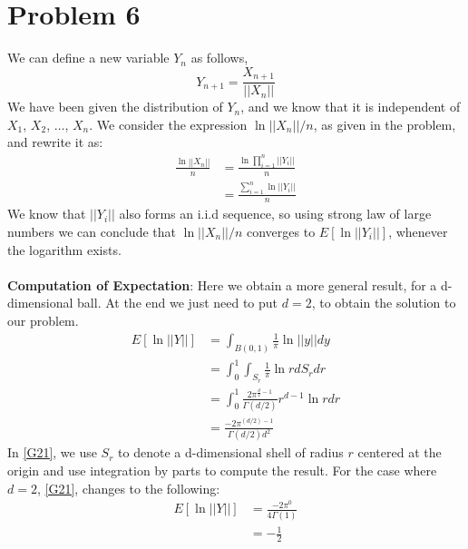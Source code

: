 \documentclass{article}
\begin{document}
\section{Problem 6}
We can define a new variable $Y_n$ as follows, 
\begin{equation}
    \label{G19}
    Y_{n+1} = \frac{X_{n+1}}{||X_n||}
\end{equation}
We have been given the distribution of $Y_n$, and we know that it is independent of $X_1$, $X_2$, $\dots$, $X_n$. We consider the expression $\ln{||X_n||}/n$, as given in the problem, and rewrite it as: 
\begin{equation}
    \label{G20}
    \begin{split}
        \frac{\ln{||X_n||}}{n} &= \frac{\ln{\prod_{i=1}^{n}||Y_i||}}{n}\\
        &= \frac{\sum_{i=1}^{n} \ln{||Y_i||}}{n}
    \end{split}
\end{equation}
We know that $||Y_i||$ also forms an i.i.d sequence, so using strong law of large numbers we can conclude that $\ln{||X_n||}/n$ converges to $E[\ln{||Y_i||}]$, whenever the logarithm exists.\\\\
\textbf{Computation of Expectation}: Here we obtain a more general result, for a d-dimensional ball. At the end we just need to put $d=2$, to obtain the solution to our problem. 
\begin{equation}
    \label{G21}
    \begin{split}
        E[\ln{||Y||}] &= \int_{B(0, 1)} \frac{1}{\pi} \ln{||y||} dy\\
        &= \int_{0}^{1} \int_{S_r}  \frac{1}{\pi} \ln{r} dS_r dr\\
        &= \int_{0}^{1} \frac{2\pi^{\frac{d}{2}-1}}{\Gamma(d/2)} r^{d-1} \ln{r} dr\\
        &= \frac{-2\pi^{(d/2)-1}}{\Gamma(d/2)d^2}
    \end{split}
\end{equation}
In \ref{G21}, we use $S_r$ to denote a d-dimensional shell of radius $r$ centered at the origin and use integration by parts to compute the result. For the case where $d=2$, \ref{G21}, changes to the following: 
\begin{equation}
    \label{G22}
    \begin{split}
        E[\ln{||Y||}] &= \frac{-2\pi^{0}}{4\Gamma(1)}\\
        &= -\frac{1}{2}
    \end{split}
\end{equation}
\newpage 
\end{document}
